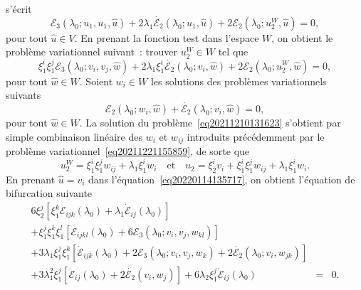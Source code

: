 \documentclass{article}
\begin{document}
s'{\'e}crit
\begin{equation}
  \mathcal{E}_3 (\lambda_0 ; u_1, u_1, \hat{u}) + 2 \lambda_1
  \dot{\mathcal{E}_2} (\lambda_0 ; u_1, \hat{u}) + 2\mathcal{E}_2 (\lambda_0 ;
  u_2^W, \hat{u}) = 0,
\end{equation}
pour tout $\hat{u} \in V$. En prenant la fonction test dans l'espace $W$, on
obtient le probl{\`e}me variationnel suivant~: trouver $u_2^W \in W$ tel que
\begin{equation}
  \label{eq20211210131623} \xi_1^i \xi_1^j \mathcal{E}_3 (\lambda_0 ; v_i,
  v_j, \hat{w}) + 2 \lambda_1 \xi_1^i  \dot{\mathcal{E}_2} (\lambda_0 ; v_i,
  \hat{w}) + 2\mathcal{E}_2 (\lambda_0 ; u_2^W, \hat{w}) = 0,
\end{equation}
pour tout $\hat{w} \in W$. Soient $w_i \in W$ les solutions des probl{\`e}mes
variationnels suivants
\begin{equation}
  \label{eq20220208143055} \mathcal{E}_2 (\lambda_0 ; w_i, \hat{w}) +
  \dot{\mathcal{E}_2} (\lambda_0 ; v_i, \hat{w}) = 0,
\end{equation}
pour tout $\hat{w} \in W$. La solution du
probl{\`e}me~\eqref{eq20211210131623} s'obtient par simple combinaison
lin{\'e}aire des $w_i$ et $w_{ij}$ introduits pr{\'e}c{\'e}demment par le
probl{\`e}me variationnel~\eqref{eq20211221155859}, de sorte que
\begin{equation}
  \label{eq20220124135324} u_2^W = \xi_1^i \xi_1^j w_{i  j} +
  \lambda_1 \xi_1^i w_i \quad \text{et} \quad u_2 = \xi_2^i v_i + \xi_1^i
  \xi_1^j w_{i  j} + \lambda_1 \xi_1^i w_i .
\end{equation}
En prenant $\hat{u} = v_i$ dans l'{\'e}quation~\eqref{eq20220114135717}, on
obtient l'{\'e}quation de bifurcation suivante
\begin{eqnarray}
  6 \xi_2^j  [\xi_1^k \mathcal{E}_{i  j  k} (\lambda_0) +
  \lambda_1  \dot{\mathcal{E}}_{i  j} (\lambda_0)] &  &  \nonumber\\
  + \xi_1^j \xi_1^k \xi_1^l  [\mathcal{E}_{i  j  k  l}
  (\lambda_0) + 6\mathcal{E}_3 (\lambda_0 ; v_i, v_j, w_{k  l})] &  &
  \nonumber\\
  + 3 \lambda_1 \xi_1^j \xi_1^k  [\dot{\mathcal{E}}_{i  j  k}
  (\lambda_0) + 2\mathcal{E}_3 (\lambda_0 ; v_i, v_j, w_k) + 2
  \dot{\mathcal{E}_2} (\lambda_0 ; v_i, w_{j  k})] &  &  \nonumber\\
  + 3 \lambda_1^2 \xi_1^j  [\ddot{\mathcal{E}}_{i  j} (\lambda_0) + 2
  \dot{\mathcal{E}_2} (v_i, w_j)] + 6 \lambda_2 \xi_1^j  \dot{\mathcal{E}}_{i
   j} (\lambda_0) & = & 0.  \label{eq20220210143805}
\end{eqnarray}
\end{document}

